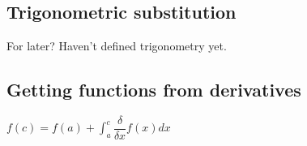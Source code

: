 
\subsection{Trigonometric substitution}

For later? Haven't defined trigonometry yet.

\subsection{Getting functions from derivatives}

$f(c)=f(a)+\int^c_a \dfrac{\delta }{\delta x}f(x) dx$

